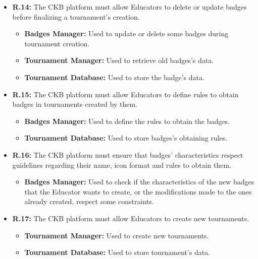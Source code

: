 \documentclass{article}
\begin{document}
{\begin{itemize}
\begin{itemize}
              \item \textbf{Tournament Database:} Used to store battle and scores' data. The scores are both the automatically generated ones and the ones
              given by the Educator through the manual evaluation process.  
          \end{itemize}
    \item \textbf{R.14:} The CKB platform must allow Educators to delete or update badges before finalizing a tournament's creation.
          \begin{itemize}
              \item \textbf{Badges Manager:} Used to update or delete some badges during tournament creation.
              \item \textbf{Tournament Manager:} Used to retrieve old badges's data.
              \item \textbf{Tournament Database:}  Used to store the badge's data.
          \end{itemize}
    \item \textbf{R.15:} The CKB platform must allow Educators to define rules to obtain badges in tournaments created by them.
          \begin{itemize}
              \item \textbf{Badges Manager:} Used to define the rules to obtain the badges.
              \item \textbf{Tournament Database:} Used to store badges's obtaining rules.
          \end{itemize}
    \item \textbf{R.16:} The CKB platform must ensure that badges' characteristics respect guidelines regarding their
          name, icon format and rules to obtain them.
          \begin{itemize}
              \item \textbf{Badges Manager:} Used to check if the characteristics of the new badges
              that the Educator wants to create, or the modifications made to the ones already 
              created, respect some constraints.
          \end{itemize}
    \item \textbf{R.17:} The CKB platform must allow Educators to create new tournaments.
          \begin{itemize}
              \item \textbf{Tournament Manager:} Used to create new tournaments.
              \item \textbf{Tournament Database:} Used to store tournament's data.

\end{itemize}
\end{itemize}}
\end{document}
